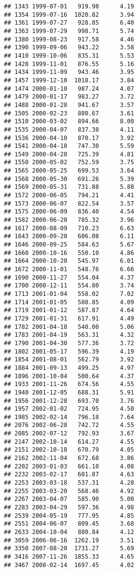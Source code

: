 \documentclass[]{article}
\begin{document}
\begin{verbatim}
## 1343 1999-07-01   919.98      4.19
## 1354 1999-07-16  1020.82      3.94
## 1361 1999-07-27   928.85      6.40
## 1363 1999-07-29   998.71      5.74
## 1380 1999-08-23   917.58      4.46
## 1390 1999-09-06   943.22      3.58
## 1410 1999-10-06   835.31      5.53
## 1428 1999-11-01   876.55      5.16
## 1434 1999-11-09   943.46      3.95
## 1457 1999-12-10  1018.17      3.84
## 1474 2000-01-10   987.24      4.07
## 1479 2000-01-17   983.27      3.72
## 1488 2000-01-28   941.67      3.57
## 1505 2000-02-23   880.67      3.61
## 1510 2000-03-02   894.66      8.00
## 1535 2000-04-07   837.38      4.11
## 1536 2000-04-10   870.17      3.92
## 1541 2000-04-18   747.30      5.59
## 1549 2000-04-28   725.39      4.81
## 1550 2000-05-02   752.59      3.75
## 1565 2000-05-25   699.53      3.64
## 1568 2000-05-30   691.26      5.39
## 1569 2000-05-31   731.88      5.88
## 1572 2000-06-05   794.21      4.41
## 1573 2000-06-07   822.54      3.57
## 1575 2000-06-09   836.40      4.54
## 1582 2000-06-20   785.32      3.96
## 1617 2000-08-09   710.23      6.63
## 1643 2000-09-20   606.08      6.11
## 1646 2000-09-25   584.63      5.67
## 1660 2000-10-16   550.10      4.86
## 1664 2000-10-20   545.97      6.01
## 1672 2000-11-01   548.76      6.66
## 1690 2000-11-27   554.04      4.37
## 1700 2000-12-11   554.80      3.74
## 1713 2001-01-04   558.02      7.02
## 1714 2001-01-05   580.85      4.09
## 1719 2001-01-12   587.87      4.64
## 1729 2001-01-31   617.91      4.49
## 1782 2001-04-18   540.00      5.06
## 1783 2001-04-19   563.31      4.32
## 1790 2001-04-30   577.36      3.72
## 1802 2001-05-17   596.39      4.19
## 1854 2001-08-01   562.79      3.92
## 1884 2001-09-13   499.25      4.97
## 1896 2001-10-04   500.64      4.37
## 1933 2001-11-26   674.56      4.55
## 1940 2001-12-05   688.31      5.91
## 1956 2001-12-28   693.70      3.76
## 1957 2002-01-02   724.95      4.50
## 1985 2002-02-14   796.18      7.64
## 2076 2002-06-28   742.72      4.55
## 2085 2002-07-12   792.93      3.67
## 2147 2002-10-14   614.27      4.55
## 2151 2002-10-18   670.79      4.05
## 2162 2002-11-04   672.68      3.86
## 2202 2003-01-03   661.10      4.08
## 2232 2003-02-17   601.87      4.63
## 2253 2003-03-18   537.31      4.28
## 2255 2003-03-20   568.46      4.92
## 2267 2003-04-07   585.90      5.00
## 2283 2003-04-29   597.36      4.98
## 2539 2004-05-19   777.95      4.85
## 2551 2004-06-07   809.45      3.68
## 2633 2004-10-04   880.84      4.12
## 3059 2006-06-16  1262.19      3.51
## 3350 2007-08-20  1731.27      5.69
## 3416 2007-11-26  1855.33      4.65
## 3467 2008-02-14  1697.45      4.02

\end{verbatim}
\end{document}
